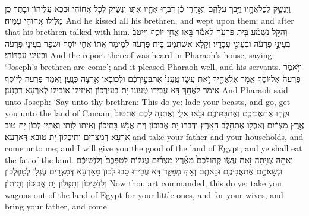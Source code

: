 {וַיְנַשֵּׁ֥ק לְכׇל\maqqaf אֶחָ֖יו וַיֵּ֣בְךְּ עֲלֵהֶ֑ם וְאַ֣חֲרֵי כֵ֔ן דִּבְּר֥וּ אֶחָ֖יו אִתּֽוֹ׃}
{וְנַשֵּׁיק לְכָל אֲחוֹהִי וּבְכָא עֲלֵיהוֹן וּבָתַר כֵּן מַלִּילוּ אֲחוֹהִי עִמֵּיהּ׃}
{And he kissed all his brethren, and wept upon them; and after that his brethren talked with him.}{}
{וְהַקֹּ֣ל נִשְׁמַ֗ע בֵּ֤ית פַּרְעֹה֙ לֵאמֹ֔ר בָּ֖אוּ אֲחֵ֣י יוֹסֵ֑ף וַיִּיטַב֙ בְּעֵינֵ֣י פַרְעֹ֔ה וּבְעֵינֵ֖י עֲבָדָֽיו׃}
{וְקָלָא אִשְׁתְּמַע בֵּית פַּרְעֹה לְמֵימַר אֲתוֹ אֲחֵי יוֹסֵף וּשְׁפַר בְּעֵינֵי פַּרְעֹה וּבְעֵינֵי עַבְדּוֹהִי׃}
{And the report thereof was heard in Pharaoh’s house, saying: ‘Joseph’s brethren are come’; and it pleased Pharaoh well, and his servants.}{}
{וַיֹּ֤אמֶר פַּרְעֹה֙ אֶל\maqqaf יוֹסֵ֔ף אֱמֹ֥ר אֶל\maqqaf אַחֶ֖יךָ זֹ֣את עֲשׂ֑וּ טַֽעֲנוּ֙ אֶת\maqqaf בְּעִ֣ירְכֶ֔ם וּלְכוּ\maqqaf בֹ֖אוּ אַ֥רְצָה כְּנָֽעַן׃}
{וַאֲמַר פַּרְעֹה לְיוֹסֵף אֵימַר לַאֲחָךְ דָּא עֲבִידוּ טְעוּנוּ יָת בְּעִירְכוֹן וְאִיזִילוּ אוֹבִילוּ לְאַרְעָא דִּכְנָעַן׃}
{And Pharaoh said unto Joseph: ‘Say unto thy brethren: This do ye: lade your beasts, and go, get you unto the land of Canaan;}{}
{וּקְח֧וּ אֶת\maqqaf אֲבִיכֶ֛ם וְאֶת\maqqaf בָּתֵּיכֶ֖ם וּבֹ֣אוּ אֵלָ֑י וְאֶתְּנָ֣ה לָכֶ֗ם אֶת\maqqaf טוּב֙ אֶ֣רֶץ מִצְרַ֔יִם וְאִכְל֖וּ אֶת\maqqaf חֵ֥לֶב הָאָֽרֶץ׃}
{וּדְבַרוּ יָת אֲבוּכוֹן וְיָת אֲנָשׁ בָּתֵּיכוֹן וְאֵיתוֹ לְוָתִי וְאֶתֵּין לְכוֹן יָת טוּב אַרְעָא דְּמִצְרַיִם וְתֵיכְלוּן יָת טוּבָא דְּאַרְעָא׃}
{and take your father and your households, and come unto me; and I will give you the good of the land of Egypt, and ye shall eat the fat of the land.}{}
{וְאַתָּ֥ה צֻוֵּ֖יתָה זֹ֣את עֲשׂ֑וּ קְחוּ\maqqaf לָכֶם֩ מֵאֶ֨רֶץ מִצְרַ֜יִם עֲגָל֗וֹת לְטַפְּכֶם֙ וְלִנְשֵׁיכֶ֔ם וּנְשָׂאתֶ֥ם אֶת\maqqaf אֲבִיכֶ֖ם וּבָאתֶֽם׃}
{וְאַתְּ מְפַקַּד דָּא עֲבִידוּ סַבוּ לְכוֹן מֵאַרְעָא דְּמִצְרַיִם עֶגְלָן לְטַפְלְכוֹן וְלִנְשֵׁיכוֹן וְתִטְּלוּן יָת אֲבוּכוֹן וְתֵיתוֹן׃}
{Now thou art commanded, this do ye: take you wagons out of the land of Egypt for your little ones, and for your wives, and bring your father, and come.}{}
